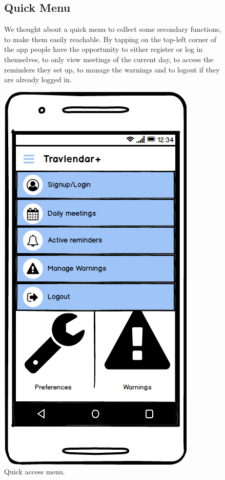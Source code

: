 	\begin{figure}
			\begin{flushleft}
			\subsection{Quick Menu}
			We thought about a quick menu to collect some secondary functions, to make them easily reachable. By tapping on the top-left corner of the app people have the opportunity to either register or log in themselves, to only view meetings of the current day, to access the reminders they set up, to manage the warnings and to logout if they are already logged in.
		\end{flushleft}
	\centering
	\includegraphics[width=0.6\linewidth]{mockups/QuickMenu}
	\caption{Quick access menu.}
	\label{fig:quickmenu}
	\end{figure}
\clearpage

